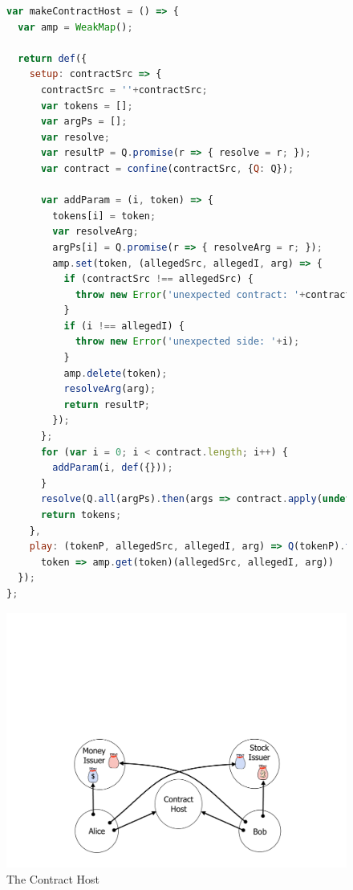 \documentclass{llncs}
\begin{document}
\begin{figure}[htbp]
\begin{minipage}[t]{0.48\linewidth}
\begin{lstlisting}[language=javascript]
var makeContractHost = () => {
  var amp = WeakMap();

  return def({
    setup: contractSrc => {
      contractSrc = ''+contractSrc;
      var tokens = [];
      var argPs = [];
      var resolve;
      var resultP = Q.promise(r => { resolve = r; });
      var contract = confine(contractSrc, {Q: Q});

      var addParam = (i, token) => {
        tokens[i] = token;
        var resolveArg;
        argPs[i] = Q.promise(r => { resolveArg = r; });
        amp.set(token, (allegedSrc, allegedI, arg) => {
          if (contractSrc !== allegedSrc) {
            throw new Error('unexpected contract: '+contractSrc);
          }
          if (i !== allegedI) {
            throw new Error('unexpected side: '+i);
          }
          amp.delete(token);
          resolveArg(arg);
          return resultP;
        });
      };
      for (var i = 0; i < contract.length; i++) {
        addParam(i, def({}));
      }
      resolve(Q.all(argPs).then(args => contract.apply(undefined, args)));
      return tokens;
    },
    play: (tokenP, allegedSrc, allegedI, arg) => Q(tokenP).then(
      token => amp.get(token)(allegedSrc, allegedI, arg))
  });
};
\end{lstlisting}
\end{minipage}
\begin{minipage}[t]{0.48\linewidth}
\vspace{0pt}
\includegraphics[scale=0.28]{5players.pdf}
\end{minipage}
\caption{The Contract Host}
\label{makeContractHost}
\end{figure}
\end{document}
